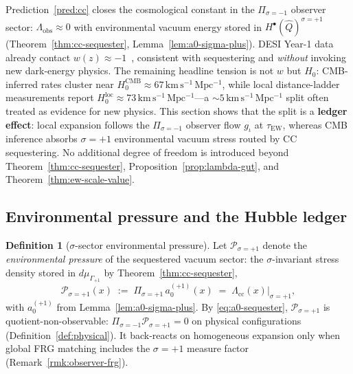 \documentclass[11pt]{article}
\theoremstyle{plain}
\theoremstyle{definition}
\newtheorem{definition}[theorem]{Definition}
\theoremstyle{remark}
\numberwithin{equation}{section}
\begin{document}
Prediction~\ref{pred:cc} closes the cosmological constant in the
$\Pi_{\sigma=-1}$ observer sector:
$\Lambda_{\mathrm{obs}}\approx 0$ with environmental vacuum energy stored in
$H^\bullet(\hat Q)^{\sigma=+1}$ (Theorem~\ref{thm:cc-sequester},
Lemma~\ref{lem:a0-sigma-plus}). DESI Year-1 data already contact
$w(z)\approx -1$~\cite{DESI2024}, consistent with sequestering and
\emph{without} invoking new dark-energy physics. The remaining headline tension
is not $w$ but $H_0$: CMB-inferred rates cluster near
$H_0^{\mathrm{CMB}}\approx 67\,\mathrm{km\,s^{-1}\,Mpc^{-1}}$, while local
distance-ladder measurements report
$H_0^{\mathrm{loc}}\approx 73\,\mathrm{km\,s^{-1}\,Mpc^{-1}}$---a
$\sim 5\,\mathrm{km\,s^{-1}\,Mpc^{-1}}$ split often treated as evidence for
new physics. This section shows that the split is a \textbf{ledger effect}:
local expansion follows the $\Pi_{\sigma=-1}$ observer flow $g_\iota$ at
$\tau_{\mathrm{EW}}$, whereas CMB inference absorbs $\sigma=+1$ environmental
vacuum stress routed by CC sequestering. No additional degree of freedom is
introduced beyond Theorem~\ref{thm:cc-sequester},
Proposition~\ref{prop:lambda-gut}, and Theorem~\ref{thm:ew-scale-value}.

\subsection{Environmental pressure and the Hubble ledger}
\label{sec:cosmology:ledger}

\begin{definition}[$\sigma$-sector environmental pressure]
\label{def:env-pressure}
Let $\mathcal{P}_{\sigma=+1}$ denote the \emph{environmental pressure} of the
sequestered vacuum sector: the $\sigma$-invariant stress density stored in
$d\mu_{\Gamma_{+1}}$ by Theorem~\ref{thm:cc-sequester},
\begin{equation}\label{eq:env-pressure}
  \mathcal{P}_{\sigma=+1}(x)
  \;:=\;
  \Pi_{\sigma=+1}\,a_0^{(+1)}(x)
  \;=\;
  \Lambda_{\mathrm{cc}}(x)\big|_{\sigma=+1},
\end{equation}
with $a_0^{(+1)}$ from Lemma~\ref{lem:a0-sigma-plus}. By
\eqref{eq:a0-sequester}, $\mathcal{P}_{\sigma=+1}$ is
quotient-non-observable: $\Pi_{\sigma=-1}\mathcal{P}_{\sigma=+1}=0$ on
physical configurations (Definition~\ref{def:physical}). It back-reacts on
homogeneous expansion only when global FRG matching includes the
$\sigma=+1$ measure factor (Remark~\ref{rmk:observer-frg}).
\end{definition}
\end{document}
